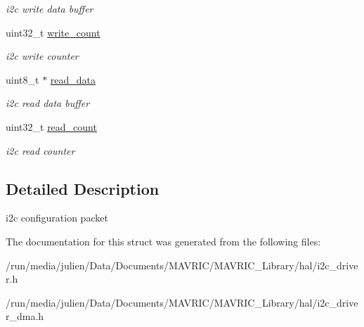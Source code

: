 \begin{DoxyCompactItemize}
\begin{DoxyCompactList}\small\item\em i2c write data buffer \end{DoxyCompactList}\item 
\hypertarget{structi2c__packet__conf__t_a14b36bc602a86ea46a31d71b1dd97048}{uint32\+\_\+t \hyperlink{structi2c__packet__conf__t_a14b36bc602a86ea46a31d71b1dd97048}{write\+\_\+count}}\label{structi2c__packet__conf__t_a14b36bc602a86ea46a31d71b1dd97048}

\begin{DoxyCompactList}\small\item\em i2c write counter \end{DoxyCompactList}\item 
\hypertarget{structi2c__packet__conf__t_a1a942034e0bf3ee408a2e348ab331a5c}{uint8\+\_\+t $\ast$ \hyperlink{structi2c__packet__conf__t_a1a942034e0bf3ee408a2e348ab331a5c}{read\+\_\+data}}\label{structi2c__packet__conf__t_a1a942034e0bf3ee408a2e348ab331a5c}

\begin{DoxyCompactList}\small\item\em i2c read data buffer \end{DoxyCompactList}\item 
\hypertarget{structi2c__packet__conf__t_a6e6a4176bf98751a0c9b685b5bd72983}{uint32\+\_\+t \hyperlink{structi2c__packet__conf__t_a6e6a4176bf98751a0c9b685b5bd72983}{read\+\_\+count}}\label{structi2c__packet__conf__t_a6e6a4176bf98751a0c9b685b5bd72983}

\begin{DoxyCompactList}\small\item\em i2c read counter \end{DoxyCompactList}\end{DoxyCompactItemize}


\subsection{Detailed Description}
i2c configuration packet 

The documentation for this struct was generated from the following files\+:\begin{DoxyCompactItemize}
\item 
/run/media/julien/\+Data/\+Documents/\+M\+A\+V\+R\+I\+C/\+M\+A\+V\+R\+I\+C\+\_\+\+Library/hal/i2c\+\_\+driver.\+h\item 
/run/media/julien/\+Data/\+Documents/\+M\+A\+V\+R\+I\+C/\+M\+A\+V\+R\+I\+C\+\_\+\+Library/hal/i2c\+\_\+driver\+\_\+dma.\+h\end{DoxyCompactItemize}
